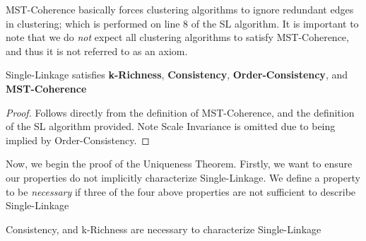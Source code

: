 MST-Coherence basically forces clustering algorithms to ignore redundant edges in clustering; which is performed on line 8 of the SL algorithm. It is important to note that we do \textit{not} expect all clustering algorithms to satisfy MST-Coherence, and thus it is not referred to as an axiom. 

\begin{theorem}
    Single-Linkage satisfies \textbf{k-Richness}, \textbf{Consistency}, \textbf{Order-Consistency}, and \textbf{MST-Coherence}
\end{theorem}

\begin{proof}
    Follows directly from the definition of MST-Coherence, and the definition of the SL algorithm provided. Note Scale Invariance is omitted due to being implied by Order-Consistency.
\end{proof}

Now, we begin the proof of the Uniqueness Theorem. Firstly, we want to ensure our properties do not implicitly characterize Single-Linkage. We define a property to be \textit{necessary} if three of the four above properties are not sufficient to describe Single-Linkage

\begin{theorem}
    Consistency, and k-Richness are necessary to characterize Single-Linkage
\end{theorem}


